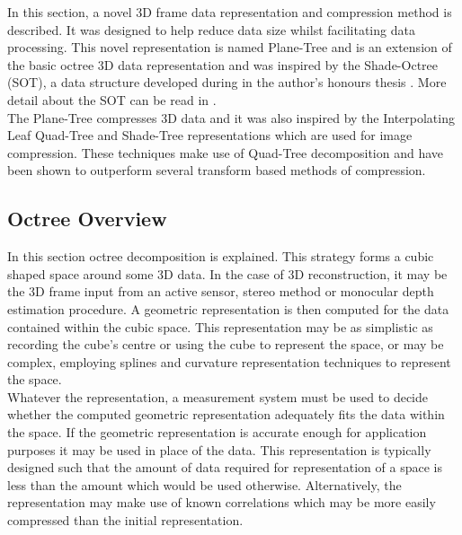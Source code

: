 In this section, a novel 3D frame data representation and compression method is described. It was designed to help reduce data size whilst facilitating data processing. This novel representation is named Plane-Tree and is an extension of the basic octree 3D data representation and was inspired by the Shade-Octree (SOT), a data structure developed during in the author's honours thesis \cite{Lincoln13Hons}. More detail about the SOT can be read in \cite{Lincoln13Hons}. \\

The Plane-Tree compresses 3D data and it was also inspired by the Interpolating Leaf Quad-Tree and Shade-Tree representations \cite{Lincoln13Interpolating,Gonzalez07ShadeTree} which are used for image compression. These techniques make use of Quad-Tree decomposition and have been shown to outperform several transform based methods of compression. 

\subsection{Octree Overview}
\label{sec:method_pt_overview}

In this section octree decomposition is explained. This strategy forms a cubic shaped space around some 3D data. In the case of 3D reconstruction, it may be the 3D frame input from an active sensor, stereo method or monocular depth estimation procedure. A geometric representation is then computed for the data contained within the cubic space. This representation may be as simplistic as recording the cube's centre or using the cube to represent the space, or may be complex, employing splines and curvature representation techniques to represent the space. \\

Whatever the representation, a measurement system must be used to decide whether the computed geometric representation adequately fits the data within the space. If the geometric representation is accurate enough for application purposes it may be used in place of the data. This representation is typically designed such that the amount of data required for representation of a space is less than the amount which would be used otherwise. Alternatively, the representation may make use of known correlations which may be more easily compressed than the initial representation. \\


